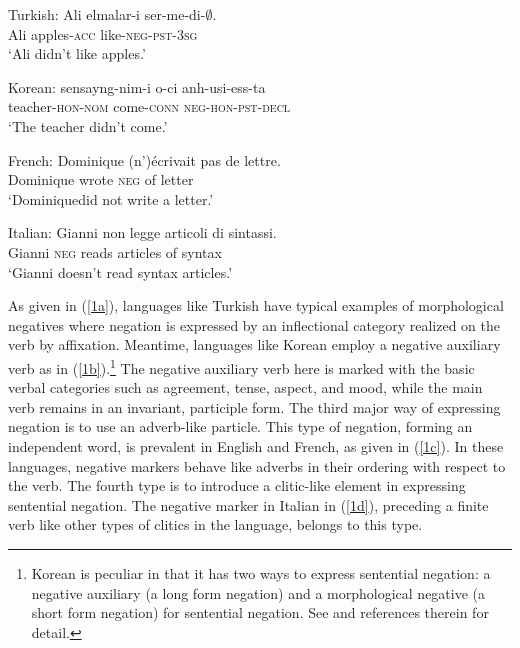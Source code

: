 \documentclass[output=paper]{langsci/langscibook}
\begin{document}
\begin{exe}
\ex \begin{xlist}
\ex \label{1a} Turkish:
\gll Ali  elmalar-i  ser-me-di-$\emptyset$. \\
Ali apples-\textsc{acc}  like-\textsc{neg}-\textsc{pst}-\textsc{3sg} \\
`Ali didn't like apples.'

\ex \label{1b} Korean:
\gll sensayng-nim-i o-ci anh-usi-ess-ta \\
teacher-\textsc{hon}-\textsc{nom} come-\textsc{conn} \textsc{neg}-\textsc{hon}-\textsc{pst}-\textsc{decl} \\
`The teacher didn't come.'

\ex \label{1c} French:
\gll Dominique (n')\'{e}crivait pas de lettre.\\
Dominique wrote \textsc{neg} of letter \\
`Dominiquedid not write a letter.'

\ex \label{1d} Italian:
\gll Gianni non legge articoli di sintassi. \\
Gianni \textsc{neg} reads articles of syntax \\
`Gianni doesn't read syntax articles.'

\end{xlist}\end{exe}
%
As given in (\ref{1a}),
languages like Turkish
have typical examples of morphological negatives where
negation is expressed by an inflectional category realized on the
verb by affixation. Meantime, languages like Korean
 employ a negative auxiliary verb as in (\ref{1b}).\footnote{Korean
 is peculiar in that it has two ways to
 express sentential negation: a negative auxiliary (a long form
 negation)  and a morphological negative (a short form negation)
 for sentential negation. See \citet{Kim:00,Kim:16} and references therein for detail.}
  The negative auxiliary
 verb here is marked with the basic verbal categories such as agreement, tense, aspect, and mood, while the main verb remains in an invariant, participle form. The third major way of expressing negation is to use an adverb-like
particle. This type of negation, forming an independent word, is prevalent in English and French, as given in (\ref{1c}). In these languages, negative markers behave like adverbs in their ordering with respect to the verb. The fourth
type is to introduce a clitic-like element in
expressing sentential negation. The negative marker in Italian in (\ref{1d}), preceding a finite verb like other types of clitics in the language,
belongs to this type.
\end{document}
